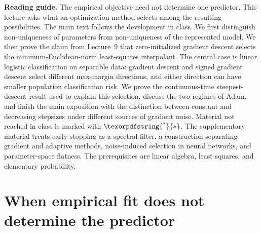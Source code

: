 \documentclass[11pt,twoside]{article}
\newcommand{\suppmark}{\texorpdfstring{\textsuperscript{*}}{*}}
\theoremstyle{definition}
\theoremstyle{remark}
\begin{document}
\begin{center}
\end{center}

\noindent\textbf{Reading guide.}
The empirical objective need not determine one predictor. This lecture asks
what an optimization method selects among the resulting possibilities. The
main text follows the development in class. We first distinguish
non-uniqueness of parameters
from non-uniqueness of the represented model. We then prove the claim from
Lecture~9 that zero-initialized gradient descent selects the
minimum-Euclidean-norm least-squares interpolant. The central case is linear
logistic classification on separable data: gradient descent and signed
gradient descent select different max-margin directions, and either direction
can have smaller population classification risk. We prove the continuous-time
steepest-descent result used to explain this selection, discuss the two regimes
of Adam, and finish the main exposition with the distinction between constant
and decreasing stepsizes under different sources of gradient noise. Material
not reached in class is marked with $\suppmark$. The supplementary material
treats early stopping as a spectral filter, a construction separating
gradient and adaptive methods, noise-induced
selection in neural networks, and parameter-space flatness. The prerequisites
are linear algebra, least squares, and elementary probability.

\section{When empirical fit does not determine the predictor}
\label{sec:setup}
\end{document}
